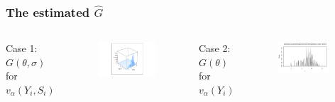 \documentclass[10pt,mathserif,aspectratio=169]{beamer}
\begin{document}
\begin{frame}
  \frametitle{The estimated $\hat{G}$}
  \begin{columns}[T,onlytextwidth]
    Case 1: $G(\theta,\sigma)$ for $v_\alpha(Y_i,S_i)$
    \begin{figure}
      \centering
      \includegraphics[width=\textwidth]{../../Figures/2013-2022/GMM_fd/GLVmix.pdf}
    \end{figure}

    Case 2: $G(\theta)$ for $v_\alpha(Y_i)$
    \begin{figure}
      \centering
      \includegraphics[width=0.9\textwidth]{../../Figures/2013-2022/GMM_fd/GLmix.pdf}
    \end{figure}
  \end{columns}
\end{frame}
\end{document}
